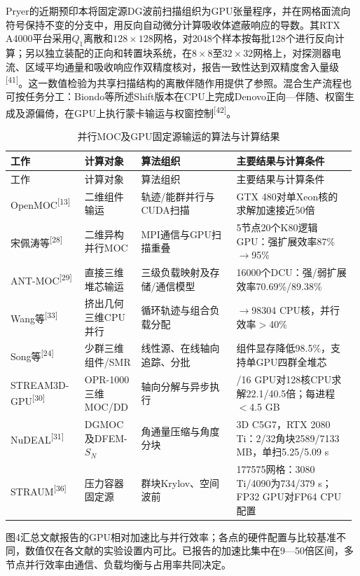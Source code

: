 \documentclass[UTF8, zihao=-4, fontset=none, a4paper]{ctexart}
\newcommand{\upcite}[1]{\textsuperscript{[#1]}}
\begin{document}
Pryer的近期预印本将固定源DG波前扫描组织为GPU张量程序，并在网格面流向符号保持不变的分支中，用反向自动微分计算吸收体遮蔽响应的导数。其RTX A4000平台采用\(Q_{1}\)离散和\(128 \times 128\)网格，对2048个样本按每批128个进行反向计算；另以独立装配的正向和转置块系统，在\(8 \times 8\)至\(32 \times 32\)网格上，对探测器电流、区域平均通量和吸收响应作双精度核对，报告一致性达到双精度舍入量级\upcite{41}。这一数值检验为共享扫描结构的离散伴随作用提供了参照。混合生产流程也可按任务分工：Biondo等所述Shift版本在CPU上完成Denovo正向---伴随、权窗生成及源偏倚，在GPU上执行蒙卡输运与权窗控制\upcite{42}。 \begin{longtable}{@{}>{\raggedright\arraybackslash}p{0.21\linewidth}>{\raggedright\arraybackslash}p{0.16\linewidth}>{\raggedright\arraybackslash}p{0.27\linewidth}>{\raggedright\arraybackslash}p{0.34\linewidth}@{}}
\caption{并行MOC及GPU固定源输运的算法与计算结果}\label{tab:2}\\
\toprule
工作 & 计算对象 & 算法组织 & 主要结果与计算条件 \\
\midrule
\endfirsthead
\toprule
工作 & 计算对象 & 算法组织 & 主要结果与计算条件 \\
\midrule
\endhead
\bottomrule
\endlastfoot
OpenMOC\upcite{13} & 二维组件输运 & 轨迹/能群并行与CUDA扫描 & GTX 480对单Xeon核的求解加速接近50倍 \\
宋佩涛等\upcite{28} & 二维异构并行MOC & MPI通信与GPU扫描重叠 & 5节点20个K80逻辑GPU：强扩展效率87\%$\rightarrow$95\% \\
ANT-MOC\upcite{29} & 直接三维堆芯输运 & 三级负载映射及存储/通信模型 & 16000个DCU：强/弱扩展效率70.69\%/89.38\% \\
Wang等\upcite{33} & 挤出几何三维CPU并行 & 循环轨迹与组合负载分配 & 10240$\rightarrow$98304 CPU核，并行效率$>$40\% \\
Song等\upcite{24} & 少群三维组件/SMR & 线性源、在线轴向追踪、分批 & 组件显存降低98.5\%，支持单GPU四群全堆芯 \\
STREAM3D-GPU\upcite{30} & OPR-1000三维MOC/DD & 轴向分解与异步执行 & 8/16 GPU对128核CPU求解22.1/40.5倍；每进程$<$4.5 GB \\
NuDEAL\upcite{31} & DGMOC及DFEM-$S_N$ & 角通量压缩与角度分块 & 3D C5G7，RTX 2080 Ti：2/32角块2589/7133 MB，单扫5.25/5.09 s \\
STRAUM\upcite{36} & 压力容器固定源 & 群块Krylov、空间波前 & 177575网格：3080 Ti/4090为734/379 s；FP32 GPU对FP64 CPU配置 \\
\end{longtable}

图4汇总文献报告的GPU相对加速比与并行效率；各点的硬件配置与比较基准不同，数值仅在各文献的实验设置内可比。已报告的加速比集中在9---50倍区间，多节点并行效率由通信、负载均衡与占用率共同决定。
\end{document}
